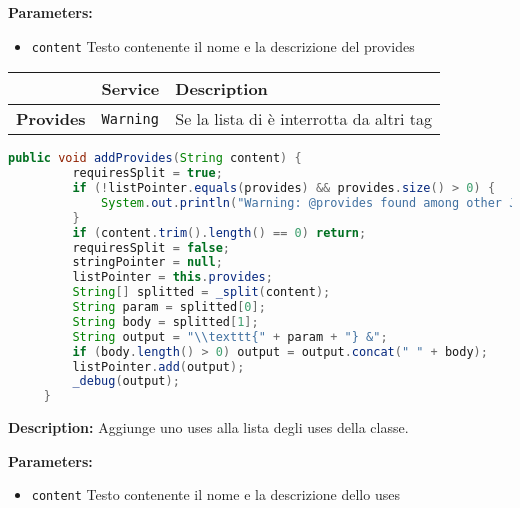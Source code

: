 \textbf{Parameters:}
\begin{itemize}
  \item\texttt{content} Testo contenente il nome e la descrizione del provides  
\end{itemize}

\begin{table}[!h]\centering
\begin{tabular}{|l|p{}|p{}|}
\hline & \textbf{Service} & \textbf{Description} \\ \hline
\multirow{1}{*}{\textbf{Provides}}
& \texttt{Warning} & Se la lista di è interrotta da altri tag \\
\hline
\end{tabular}\end{table}
\begin{lstlisting}[language=Java]
     public void addProvides(String content) {
         requiresSplit = true;
         if (!listPointer.equals(provides) && provides.size() > 0) {
             System.out.println("Warning: @provides found among other Javadoc keywords. You should put all @provides together.");
         }
         if (content.trim().length() == 0) return;
         requiresSplit = false;
         stringPointer = null;
         listPointer = this.provides;
         String[] splitted = _split(content);
         String param = splitted[0];
         String body = splitted[1];
         String output = "\\texttt{" + param + "} &";
         if (body.length() > 0) output = output.concat(" " + body);
         listPointer.add(output);
         _debug(output);
     }
\end{lstlisting}
\textbf{Description:}  Aggiunge uno uses alla lista degli uses della classe. 

\textbf{Parameters:}
\begin{itemize}
  \item\texttt{content} Testo contenente il nome e la descrizione dello uses  
\end{itemize}


